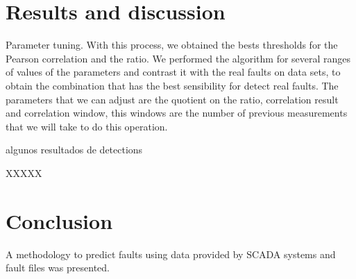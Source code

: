 \documentclass[journal]{IEEEtran}
\begin{document}
\section{Results and discussion}\label{sec:results}
Parameter tuning.
With this process, we obtained the bests thresholds for the Pearson correlation and the ratio. We performed the algorithm for several ranges of values of the parameters and contrast it with the real faults on data sets, to obtain the combination that has the best sensibility for detect real faults. The parameters that we can adjust are the quotient on the ratio, correlation result and correlation window, this windows are the number of previous measurements that we will take to do this operation.


algunos resultados de detections


XXXXX
\section{Conclusion}\label{sec:conclusion}
A methodology to predict faults using data provided by SCADA systems and fault files was presented.



\end{document}
